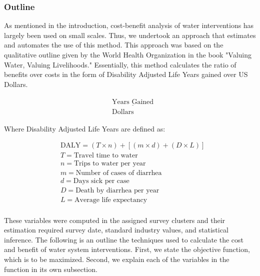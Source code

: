 

\subsubsection*{Outline}
As mentioned in the introduction, cost-benefit analysis of water interventions has largely been used on small scales. 
Thus, we undertook an approach that estimates and automates the use of this method.
This approach was based on the qualitative outline given by the World Health Organization in the book "Valuing Water, Valuing Livelihoods."
Essentially, this method calculates the ratio of benefits over costs in the form of Disability Adjusted Life Years gained over US Dollars.

\begin{equation}
\begin{aligned}
& \begin{matrix} \underline{\text{Years Gained}} \\ \text{Dollars} \end{matrix}
\end{aligned}
\end{equation}

Where Disability Adjusted Life Years are defined as:

\begin{equation}
\begin{aligned}
& \text{DALY} = (T \times n) + [(m \times d) + (D \times L)]\\
& T = \text{Travel time to water}\\
& n = \text{Trips to water per year}\\
& m = \text{Number of cases of diarrhea}\\
& d = \text{Days sick per case}\\
& D = \text{Death by diarrhea per year}\\
& L = \text{Average life expectancy}\\
\end{aligned}
\end{equation}

These variables were computed in the assigned survey clusters and their estimation required survey date, standard industry values, and statistical inference.
The following is an outline the techniques used to calculate the cost and benefit of water system interventions.
First, we state the objective function, which is to be maximized. 
Second, we explain each of the variables in the function in its own subsection.

